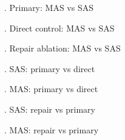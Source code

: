 . Primary: MAS vs SAS\par
{}. Direct control: MAS vs SAS\par
{}. Repair ablation: MAS vs SAS\par
{}. SAS: primary vs direct\par
{}. MAS: primary vs direct\par
{}. SAS: repair vs primary\par
{}. MAS: repair vs primary\par
